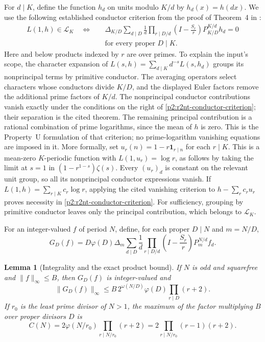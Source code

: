 \documentclass[11pt,a4paper]{article}
\newtheorem{lemma}[theorem]{Lemma}
\theoremstyle{definition}
\theoremstyle{remark}
\numberwithin{equation}{section}
\begin{document}
For $d\mid K$, define the function $h_d$ on units modulo $K/d$ by
$h_d(x)=h(dx)$.  We use the following established conductor criterion
from the proof of Theorem~4 in \cite{p2:Bharadwaj2022}:
\begin{equation}
\label{p2:r2nt-conductor-criterion}
\begin{aligned}
 L(1,h)\in\mathcal L_K
 \quad\Longleftrightarrow\quad &
 \Delta_{K/D}\sum_{d\mid D}\frac1d
 \prod_{r\mid D/d}\left(I-\frac{S_r}{r}\right)
 P_{K/D}^{K/d}h_d=0
 \\
 &\text{for every proper }D\mid K.
\end{aligned}
\end{equation}
Here and below products indexed by $r$ are over primes.  To explain
the input's scope, the character expansion of
$L(s,h)=\sum_{d\mid K}d^{-s}L(s,h_d)$ groups its nonprincipal
terms by primitive conductor.  The averaging operators select
characters whose conductors divide $K/D$, and the displayed Euler
factors remove the additional prime factors of $K/d$.  The
nonprincipal conductor contributions vanish exactly under the
conditions on the right of \eqref{p2:r2nt-conductor-criterion}; their
separation is the cited theorem.  The remaining principal contribution
is a rational combination of prime logarithms, since the mean of
$h$ is zero.  This is the Property~U formulation of that criterion;
no prime-logarithm vanishing equations are imposed in it.  More
formally, set $u_r(n)=1-r\mathbf1_{r\mid n}$ for each $r\mid K$.
This is a mean-zero $K$-periodic function with
$L(1,u_r)=\log r$, as follows by taking the limit at $s=1$ in
$(1-r^{1-s})\zeta(s)$.  Every $(u_r)_d$ is constant on the relevant
unit group, so all its nonprincipal conductor expressions vanish.
If $L(1,h)=\sum_{r\mid K}c_r\log r$, applying the cited vanishing
criterion to $h-\sum_rc_ru_r$ proves necessity in
\eqref{p2:r2nt-conductor-criterion}.  For sufficiency, grouping by
primitive conductor leaves only the principal contribution, which
belongs to $\mathcal L_K$.

For an integer-valued $f$ of period $N$, define, for each proper
$D\mid N$ and $m=N/D$,
\begin{equation}
\label{p2:r2nt-gd-definition}
 G_D(f)=D\varphi(D)\Delta_m
 \sum_{d\mid D}\frac1d
 \prod_{r\mid D/d}\left(I-\frac{S_r}{r}\right)
 P_m^{N/d}f_d.
\end{equation}

\begin{lemma}[Integrality and the exact product bound]
\label{p2:r2nt-gd-norm}
If $N$ is odd and squarefree and $\|f\|_\infty\le B$, then
$G_D(f)$ is integer-valued and
\begin{equation}
\label{p2:r2nt-gd-bound}
 \|G_D(f)\|_\infty
 \le B\,2^{\omega(N/D)}\varphi(D)
            \prod_{r\mid D}(r+2).
\end{equation}
If $r_0$ is the least prime divisor of $N>1$, the maximum of the
factor multiplying $B$ over proper divisors $D$ is
\begin{equation}
\label{p2:r2nt-cn}
 C(N)=2\varphi(N/r_0)\prod_{r\mid N/r_0}(r+2)
     =2\prod_{r\mid N/r_0}(r-1)(r+2).
\end{equation}
\end{lemma}
\end{document}
